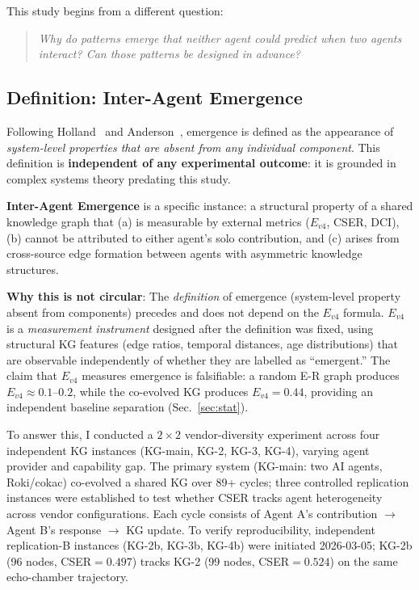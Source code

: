 \documentclass[12pt]{article}
\begin{document}
This study begins from a different question:
\begin{quote}
\textit{Why do patterns emerge that neither agent could predict when two agents interact?
Can those patterns be designed in advance?}
\end{quote}

\subsection*{Definition: Inter-Agent Emergence}

Following Holland~\cite{holland1998emergence} and Anderson~\cite{anderson1972more}, emergence is defined as the appearance of
\emph{system-level properties that are absent from any individual component}.
This definition is \textbf{independent of any experimental outcome}: it is grounded
in complex systems theory predating this study.

\textbf{Inter-Agent Emergence} is a specific instance: a structural property of a
shared knowledge graph that (a) is measurable by external metrics ($E_{v4}$, CSER, DCI),
(b) cannot be attributed to either agent's solo contribution, and (c) arises from
cross-source edge formation between agents with asymmetric knowledge structures.

\textbf{Why this is not circular}: The \emph{definition} of emergence (system-level
property absent from components) precedes and does not depend on the $E_{v4}$ formula.
$E_{v4}$ is a \emph{measurement instrument} designed after the definition was fixed,
using structural KG features (edge ratios, temporal distances, age distributions)
that are observable independently of whether they are labelled as ``emergent.''
The claim that $E_{v4}$ measures emergence is falsifiable: a random E-R graph
produces $E_{v4} \approx 0.1$--$0.2$, while the co-evolved KG produces $E_{v4} = 0.44$,
providing an independent baseline separation (Sec.~\ref{sec:stat}).

To answer this, I conducted a $2\times2$ vendor-diversity experiment across four
independent KG instances (KG-main, KG-2, KG-3, KG-4), varying agent provider and
capability gap. The primary system (KG-main: two AI agents, Roki/cokac) co-evolved
a shared KG over 89+ cycles; three controlled replication instances were established
to test whether CSER tracks agent heterogeneity across vendor configurations.
Each cycle consists of Agent A's contribution $\to$ Agent B's response $\to$ KG update.
To verify reproducibility, independent replication-B instances (KG-2b, KG-3b, KG-4b)
were initiated 2026-03-05; KG-2b (96 nodes, CSER$=0.497$) tracks KG-2
(99 nodes, CSER$=0.524$) on the same echo-chamber trajectory.
\end{document}
